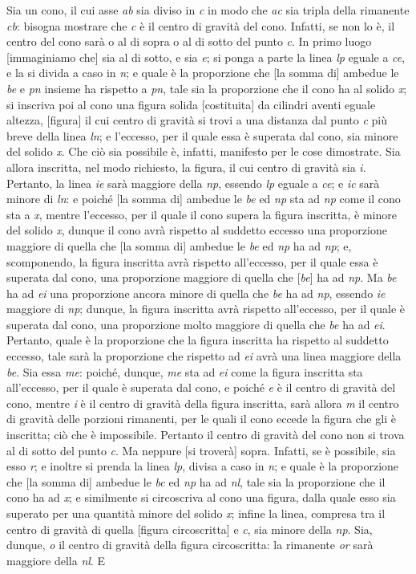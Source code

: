 \documentclass[11pt,twoside,openany]{book}
\begin{document}
Sia un cono, il cui asse \emph{ab} sia diviso in \emph{c} in modo che \emph{ac} sia tripla della rimanente \emph{cb}: bisogna mostrare che \emph{c} è il centro di gravità del cono. Infatti, se non lo è, il centro del cono sarà o al di sopra o al di sotto del punto \emph{c}. In primo luogo [immaginiamo che] sia al di sotto, e sia \emph{e}; si ponga a parte la linea \emph{lp} eguale a \emph{ce}, e la si divida a caso in \emph{n}; e quale è la proporzione che [la somma di] ambedue le \emph{be} e \emph{pn} insieme ha rispetto a \emph{pn}, tale sia la proporzione che il cono ha al solido \emph{x}; si inscriva poi al cono una figura solida [costituita] da cilindri aventi eguale altezza, [figura] il cui centro di gravità si trovi a una distanza dal punto \emph{c} più breve della linea \emph{ln}; e l'eccesso, per il quale essa è superata dal cono, sia minore del solido \emph{x}. Che ciò sia possibile è, infatti, manifesto per le cose dimostrate. Sia allora inscritta, nel modo richiesto, la figura, il cui centro di gravità sia \emph{i}. Pertanto, la linea \emph{ie} sarà maggiore della \emph{np}, essendo \emph{lp} eguale a \emph{ce}; e \emph{ic} sarà minore di \emph{ln}: e poiché [la somma di] ambedue le \emph{be} ed \emph{np} sta ad \emph{np} come il cono sta a \emph{x}, mentre l'eccesso, per il quale il cono supera la figura inscritta, è minore del solido \emph{x}, dunque il cono avrà rispetto al suddetto eccesso una proporzione maggiore di quella che [la somma di] ambedue le \emph{be} ed \emph{np} ha ad \emph{np}; e, scomponendo, la figura inscritta avrà rispetto all'eccesso, per il quale essa è superata dal cono, una proporzione maggiore di quella che [\emph{be}] ha ad \emph{np}. Ma \emph{be} ha ad \emph{ei} una proporzione ancora minore di quella che \emph{be} ha ad \emph{np}, essendo \emph{ie} maggiore di \emph{np}; dunque, la figura inscritta avrà rispetto all'eccesso, per il quale è superata dal cono, una proporzione molto maggiore di quella che \emph{be} ha ad \emph{ei}. Pertanto, quale è la proporzione che la figura inscritta ha rispetto al suddetto eccesso, tale sarà la proporzione che rispetto ad \emph{ei} avrà una linea maggiore della \emph{be}. Sia essa \emph{me}: poiché, dunque, \emph{me} sta ad \emph{ei} come la figura inscritta sta all'eccesso, per il quale è superata dal cono, e poiché \emph{e} è il centro di gravità del cono, mentre \emph{i} è il centro di gravità della figura inscritta, sarà allora \emph{m} il centro di gravità delle porzioni rimanenti, per le quali il cono eccede la figura che gli è inscritta; ciò che è impossibile. Pertanto il centro di gravità del cono non si trova al di sotto del punto \emph{c}. Ma neppure [si troverà] sopra. Infatti, se è possibile, sia esso \emph{r}; e inoltre si prenda la linea \emph{lp}, divisa a caso in \emph{n}; e quale è la proporzione che [la somma di] ambedue le \emph{bc} ed \emph{np} ha ad \emph{nl}, tale sia la proporzione che il cono ha ad \emph{x}; e similmente si circoscriva al cono una figura, dalla quale esso sia superato per una quantità minore del solido \emph{x}; infine la linea, compresa tra il centro di gravità di quella [figura circoscritta] e \emph{c}, sia minore della \emph{np}. Sia, dunque, \emph{o} il centro di gravità della figura circoscritta: la rimanente \emph{or} sarà maggiore della \emph{nl}. E 
\end{document}
